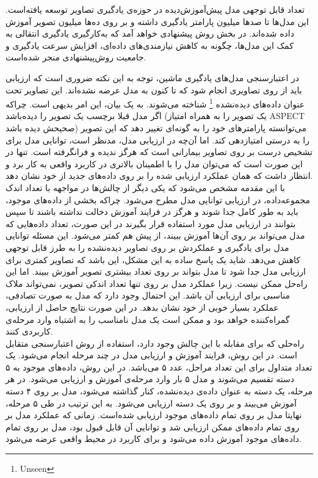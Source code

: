 تعداد قابل توجهی مدل پیش‌آموزش‌دیده در حوزه‌ی یادگیری تصاویر توسعه یافته‌است.
این مدل‌ها  تا صد‌ها میلیون پارامتر یادگیری داشته و بر روی ده‌ها میلیون تصویر آموزش داده شده‌اند. 
در بخش روش پیشنهادی خواهد آمد که به‌کارگیری یادگیری انتقالی به کمک این مدل‌ها، چگونه به کاهش نیازمندی‌های داده‌ای، افزایش سرعت یادگیری و جامعیت روش‌پیشنهادی منجر شده‌است.


در اعتبار‌سنجی مدل‌های یادگیری ماشین، توجه به این نکته ضروری است که ارزیابی باید از روی تصاویری انجام شود که تا کنون به مدل عرضه نشده‌اند.
این تصاویر تحت عنوان داده‌های دیده‌نشده
\footnote{Unseen}
 شناخته می‌شوند.
به یک بیان، این امر بدیهی است.
چراکه اگر مدل قبلا برچسب یک تصویر را دیده‌باشد (یک تصویر را به همراه امتیاز ASPECT صحیحش دیده باشد) می‌توانسته پارامتر‌های خود را به گونه‌ای تغییر دهد که این تصویر را به درستی امتیازدهی کند.
اما آن‌چه در ارزیابی مدل، مدنظر است، توانایی مدل برای تشخیص درست بر روی تصاویر بیمارانی است که هرگز ندیده و فرانگرفته است.
تنها در این صورت است که می‌توان مدل را با اطمینان بالاتری در کاربرد واقعی به کار برد و انتظار داشت که همان عملکرد ارزیابی شده را بر روی داده‌های جدید از خود نشان دهد.\\

با این مقدمه مشخص می‌شود که
یکی دیگر از چالش‌ها در مواجهه با تعداد اندک مجموعه‌داده، در ارزیابی توانایی مدل مطرح می‌شود.
چراکه بخشی از داده‌های موجود، باید به طور کامل جدا شوند و هرگز در فرایند آموزش دخالت نداشته باشند تا سپس بتوانند در ارزیابی مدل مورد استفاده قرار بگیرند
در این صورت، تعداد داده‌هایی که مدل می‌تواند بر روی آن‌ها آموزش ببیند، از پیش هم کمتر می‌شود.
این مسئله توانایی مدل برای یادگیری و عملکردش بر روی تصاویر دیده‌نشده را به طرز قابل توجهی کاهش می‌دهد.
شاید یک پاسخ ساده به این مشکل، این باشد که تصاویر کمتری برای ارزیابی مدل جدا شود تا مدل بتواند بر روی تعداد بیشتری تصویر آموزش ببیند.
اما این راه‌حل ممکن نیست.
زیرا عملکرد مدل بر روی تنها تعداد اندکی تصویر، نمی‌تواند ملاک مناسبی برای ارزیابی آن باشد.
این احتمال وجود دارد که مدل به صورت تصادفی، عملکرد بسیار خوبی از خود نشان بدهد.
در این صورت نتایج حاصل از ارزیابی،‌ گمراه‌کننده خواهد بود و ممکن است یک مدل نامناسب را به اشتباه وارد مرحله‌ی کاربردی کنند.\\

راه‌حلی که برای مقابله با این چالش وجود دارد، استفاده از روش اعتبارسنجی متقابل است.
در این روش، فرایند آموزش و ارزیابی مدل در چند مرحله انجام می‌شود.
یک تعداد متداول برای این تعداد مراحل، عدد ۵ می‌باشد.
در این روش، داده‌های موجود به ۵ دسته تقسیم می‌شوند و مدل ۵ بار وارد مرحله‌ی آموزش و ارزیابی می‌شود.
در هر مرحله، یک دسته به عنوان داده‌ی دیده‌نشده، کنار گذاشته می‌شود، مدل بر روی ۴ دسته آموزش می‌بیند و بر روی یک دسته ارزیابی می‌شود. 
به این ترتیب در طی ۵ مرحله، نهایتا مدل بر روی تمام داده‌های موجود ارزیابی شده‌است.
زمانی که عملکرد مدل بر روی تمام داده‌های ممکن ارزیابی شد و توانایی آن قابل قبول بود، مدل بر روی تمام داده‌های موجود آموزش داده‌ می‌شود و برای کاربرد در محیط واقعی عرضه می‌شود.\\

